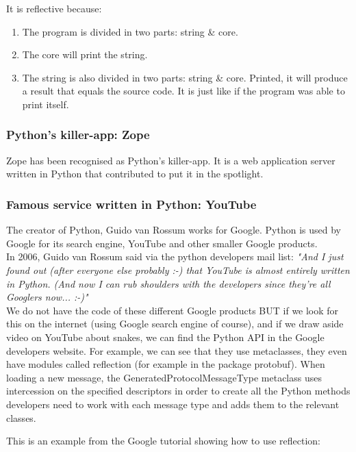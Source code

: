 It is reflective because:
\begin{enumerate}
    \item The program is divided in two parts: string \& core.
    \item The core will print the string.
    \item The string is also divided in two parts: string \& core. Printed, it will produce a result that equals the source code. It is just like if the program was able to print itself. 
\end{enumerate}

\subsubsection{Python's killer-app: Zope}
Zope has been recognised as Python's killer-app. It is a web application server written in Python that contributed to put it in the spotlight.

\subsubsection{Famous service written in Python: YouTube}
The creator of Python, Guido van Rossum works for Google. Python is used by Google for its search engine, YouTube and other smaller Google products.\\

In 2006, Guido van Rossum said via the python developers mail list:
\emph{"And I just found out (after everyone else probably :-) that YouTube is almost entirely written in Python. (And now I can rub shoulders with the developers since they're all Googlers now... :-)"}\\

We do not have the code of these different Google products BUT if we look for this on the internet (using Google search engine of course), and if we draw aside video on YouTube about snakes, we can find the Python API in the Google developers website. For example, we can see that they use metaclasses, they even have modules called reflection (for example in the package protobuf). When loading a new message, the GeneratedProtocolMessageType metaclass uses intercession on the specified descriptors in order to create all the Python methods developers need to work with each message type and adds them to the relevant classes. \cite{google_reflection_references, google_reflection_tutorial}

This is an example from the Google tutorial showing how to use reflection:



